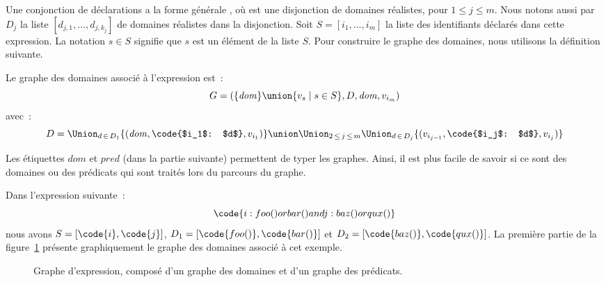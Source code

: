 Une conjonction de déclarations a la forme générale , où 
est une disjonction de domaines réalistes, pour $1 \leq j \leq m$. Nous notons
aussi par $D_j$ la liste $[d_{j,1}, \dots, d_{j,k_j}]$ de domaines réalistes
dans la disjonction. Soit $S = [i_1, \dots, i_m]$ la liste des identifiants
déclarés dans cette expression. La notation $s \in S$ signifie que $s$ est un
élément de la liste $S$. Pour construire le graphe des domaines, nous utilisons
la définition suivante.

\begin{definition}

Le {\strong graphe des domaines} associé à l'expression  est~:
%
$$G = (\{\mathit{dom}\} \union \{v_s \;\vert\; s \in S\}, D, \mathit{dom}, v_{i_m})$$
%
avec~:
%
$$D = \Union_{d \,\in\, D_1} \{(\mathit{dom}, \code{$i_1$: $d$}, v_{i_1})\} \union
      \Union_{2 \,\leq\, j \,\leq\, m}
      \Union_{d \,\in\, D_j} \{(v_{i_{j - 1}}, \code{$i_j$: $d$}, v_{i_{j}})\}$$

\end{definition}

Les étiquettes $\mathit{dom}$ et $\mathit{pred}$ (dans la partie suivante)
permettent de typer les graphes. Ainsi, il est plus facile de savoir si ce sont
des domaines ou des prédicats qui sont traités lors du parcours du graphe.

\begin{example}
\label{example:test:expression_graph1}

Dans l'expression suivante~:
%
$$\code{i: foo() or bar() and j: baz() or qux()}$$
%
nous avons $S = [\code{i}, \code{j}]$, $D_1 = [\code{foo()}, \code{bar()}]$ et
$D_2 = [\code{baz()}, \code{qux()}]$. La première partie de la
figure~\ref{figure:test:expression_graph} présente graphiquement le graphe des
domaines associé à cet exemple.

\end{example}

\begin{figure}


\caption[Graphe d'expression.]{\label{figure:test:expression_graph} Graphe
d'expression, composé d'un graphe des domaines et d'un graphe des prédicats.}

\end{figure}

